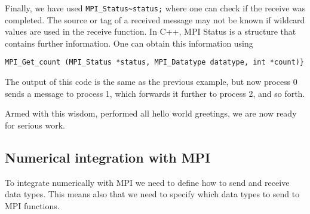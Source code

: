 Finally,  we have used  \lstinline{MPI_Status~status;} 
where one can check if the receive was completed.
The source or tag of a received message may not be known if
wildcard values are used in the receive function. In C++, MPI Status
is a structure that contains further information. One can obtain this information
using 
\begin{lstlisting}
MPI_Get_count (MPI_Status *status, MPI_Datatype datatype, int *count)}
\end{lstlisting}
The output of this code is the same as the previous example, but now
process 0 sends a message to process 1, which forwards it further
to process 2, and so forth.

Armed with this wisdom, performed all hello world greetings, we are now ready for serious work. 

\subsection{Numerical integration with MPI}

To integrate numerically with MPI we need to define how to send and receive data types. This means also that we need
to specify  which data types to send  to MPI functions. 

